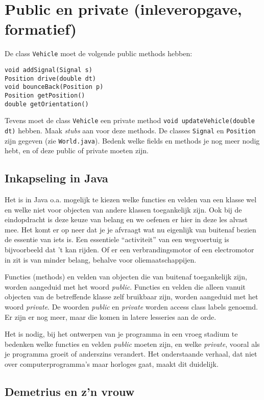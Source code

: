 \documentclass[a4paper,10pt]{article}
\newcommand{\code}[1]{\texttt{#1}}
\begin{document}
\section{Public en private (inleveropgave, formatief)}

De class \code{Vehicle} moet de volgende public methods hebben:
\begin{lstlisting}
void addSignal(Signal s)
Position drive(double dt)
void bounceBack(Position p)
Position getPosition()
double getOrientation()
\end{lstlisting}
Tevens moet de class \code{Vehicle} een private method \code{void updateVehicle(double dt)} hebben. Maak \textit{stubs} aan voor deze methods. De classes \code{Signal} en \code{Position} zijn gegeven (zie \code{World.java}). Bedenk welke fields en methods je nog meer nodig hebt, en of deze public of private moeten zijn.

\subsection*{Inkapseling in Java}

Het is in Java o.a. mogelijk te kiezen welke functies en velden van een klasse wel en welke niet voor objecten van andere klassen toegankelijk zijn.
Ook bij de eindopdracht is deze keuze van belang en we oefenen er hier in deze les alvast mee.
Het komt er op neer dat je je afvraagt wat nu eigenlijk van buitenaf bezien de essentie van iets is.
Een essentiele ``activiteit'' van een wegvoertuig is bijvoorbeeld dat 't kan rijden.
Of er een verbrandingsmotor of een electromotor in zit is van minder belang, behalve voor oliemaatschappijen.

Functies (methods) en velden van objecten die van buitenaf toegankelijk zijn, worden aangeduid met het woord \emph{public}.
Functies en velden die alleen vanuit objecten van de betreffende klasse zelf bruikbaar zijn, worden aangeduid met het woord \emph{private}.
De woorden \emph{public} en \emph{private} worden access class labels genoemd.
Er zijn er nog meer, maar die komen in latere lesseries aan de orde.

Het is nodig, bij het ontwerpen van je programma in een vroeg stadium te bedenken welke functies en velden \emph{public} moeten zijn, en welke \emph{private},
vooral als je programma groeit of anderszins verandert.
Het onderstaande verhaal, dat niet over computerprogramma's maar horloges gaat, maakt dit duidelijk.

\subsection*{Demetrius en z'n vrouw}
\end{document}
